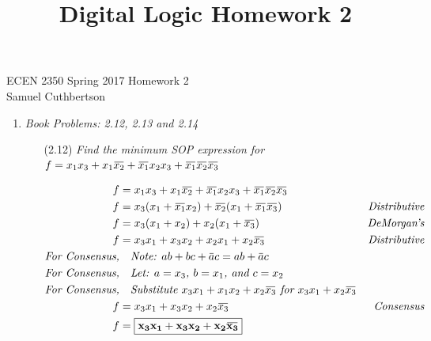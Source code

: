 \documentclass[12pt]{article}
\newcommand{\overbar}[1]{\mkern 1.5mu\overline{\mkern-1.5mu#1\mkern-1.5mu}\mkern 1.5mu}
\begin{document}
\title{Digital Logic Homework 2}

ECEN 2350 Spring 2017 \hfill Homework 2\\
Samuel Cuthbertson

\hrulefill

\begin{enumerate}

	\item \textit{Book Problems: 2.12, 2.13 and 2.14}
	\begin{enumerate}
    	
		\item[(2.12)] \textit{Find the minimum SOP expression for $f=x_1x_3 + x_1\overbar{x_2} + \overbar{x_1}x_2x_3 + \overbar{x_1}\overbar{x_2}\overbar{x_3}$}
    
    	\begin{align*}
        	f &= x_1x_3 + x_1\overbar{x_2} + \overbar{x_1}x_2x_3 + \overbar{x_1}\overbar{x_2}\overbar{x_3} \\
			f &= x_3(x_1+\overbar{x_1}x_2) + \overbar{x_2}(x_1 + \overbar{x_1}\overbar{x_3}) & \textit{Distributive} \\
            f &= x_3(x_1+x_2) + x_2(x_1+\overbar{x_3}) & \textit{DeMorgan's} \\
            f &= x_3x_1+x_3x_2+x_2x_1+x_2\overbar{x_3} & \textit{Distributive} \\
            \textit{For Consensus,}& \quad\textit{Note: $ab+bc+\overbar{a}c=ab+\overbar{a}c$}\\
            \textit{For Consensus,}& \quad\textit{Let: $a=x_3$, $b=x_1$, and $c=x_2$}\\
            \textit{For Consensus,}& \quad\textit{Substitute $x_3x_1+x_1x_2+x_2\overbar{x_3}$ for $x_3x_1+x_2\overbar{x_3}$}\\
            f &= x_3x_1+x_3x_2+x_2\overbar{x_3} & \textit{Consensus} \\
            f &= \boxed{\mathbf{x_3x_1+x_3x_2+x_2\overbar{x_3}}}
    	\end{align*}
    

\end{enumerate}
\end{enumerate}
\end{document}

